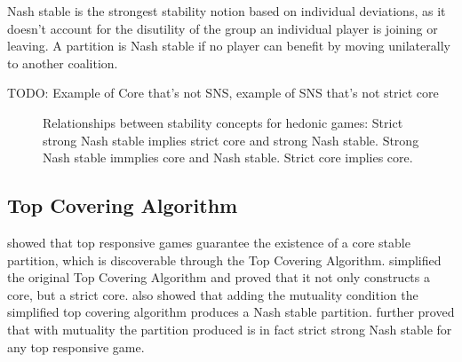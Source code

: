 \documentclass[letterpaper]{article} %
\begin{document}
Nash stable is the strongest stability notion based on individual deviations, as it doesn't account for the disutility of the group an individual player is joining or leaving. A partition is Nash stable if no player can benefit by moving unilaterally to another coalition.

TODO: Example of Core that's not SNS, example of SNS that's not strict core

\begin{figure}
\centering
{}
\caption{Relationships between stability concepts for hedonic games: Strict strong Nash stable implies strict core and strong Nash stable. Strong Nash stable immplies core and Nash stable. Strict core implies core.}
\end{figure}

\subsection{Top Covering Algorithm}

\cite{ALCALDE2004869} showed that top responsive games guarantee the existence of a core stable partition, which is discoverable through the Top Covering Algorithm. \cite{DIMITROV2007130} simplified the original Top Covering Algorithm and proved that it not only constructs a core, but a strict core. \cite{Dimitrov2006TopRA} also showed that adding the mutuality condition the simplified top covering algorithm produces a Nash stable partition. \cite{Aziz:2012:ESH:2343776.2343806} further proved that with mutuality the partition produced is in fact strict strong Nash stable for any top responsive game.
\end{document}
